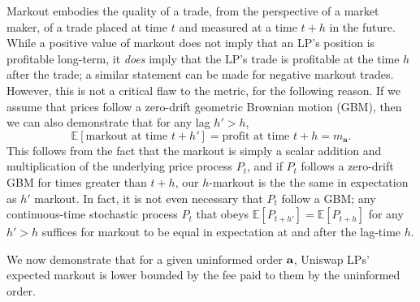     Markout embodies the quality of a trade, from the perspective of a market maker, of a trade placed at time $t$ and measured at a time $t+h$ in the future. While a positive value of markout does not imply that an LP's position is profitable long-term, it \textit{does} imply that the LP's trade is profitable at the time $h$ after the trade; a similar statement can be made for negative markout trades. However, this is not a critical flaw to the metric, for the following reason. If we assume that prices follow a zero-drift geometric Brownian motion (GBM), then we can also demonstrate that for any lag $h' > h$, $$\mathbb E[\text{markout at time } t + h'] = \text{profit at time } t+h = m_\textbf{a}.$$ %
    This follows from the fact that the markout is simply a scalar addition and multiplication of the underlying price process $P_t$, and if $P_t$ follows a zero-drift GBM for times greater than $t+h$, our $h$-markout is the the same in expectation as $h'$ markout. In fact, it is not even necessary that $P_t$ follow a GBM; any continuous-time stochastic process $P_t$ that obeys $\mathbb E[P_{t+h'}] = \mathbb E[P_{t+h}]$ for any $h' > h$ suffices for markout to be equal in expectation at and after the lag-time $h$.

    We now demonstrate that for a given uninformed order $\textbf a$, Uniswap LPs' expected markout is lower bounded by the fee paid to them by the uninformed order.




